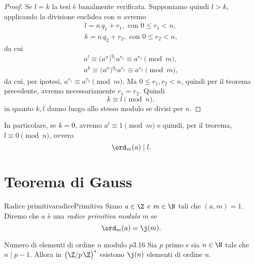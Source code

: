 \begin{proof}
	Se \(l=k\) la tesi è banalmente verificata.
	Supponiamo quindi \(l>k\), applicando la divisione euclidea con \(n\) avremo
	\begin{gather*}
		l = n\,q_1 + r_1,\text{ con }0 \le r_1 < n,\\
		k = n\,q_2 + r_2,\text{ con }0 \le r_2 < n,
	\end{gather*}
	da cui
	\begin{gather*}
		a^l \equiv \big( a^n \big)^{q_1}a^{r_1} \equiv a^{r_1} \pmod{m},\\
		a^k \equiv \big( a^n \big)^{q_2}a^{r_2} \equiv a^{r_2} \pmod{m},
	\end{gather*}
	da cui, per ipotesi, \(a^{r_1} \equiv a^{r_2} \pmod{m}\).
	Ma \(0\le r_1,r_2 <n\), quindi per il teorema precedente, avremo necessariamente \(r_1 = r_2\).
	Quindi
	\[
		k \equiv l \pmod{n},
	\]
	in quanto \(k,l\) danno luogo allo stesso modulo se divisi per \(n\).
\end{proof}

\begin{oss}
	In particolare, se \(k=0\), avremo \(a^l \equiv 1 \pmod{m}\) e quindi, per il teorema, \(l \equiv 0 \pmod{n}\), ovvero
	\[
		\ord_m(a) \mid l.
	\]
\end{oss}
%
%
\section{Teorema di Gauss}

\begin{defn}{Radice primitiva}{radicePrimitiva}
	Siano \(a\in\Z\) e \(m\in\N\) tali che \((a,m) = 1\).
	Diremo che \(a\) è una \emph{radice primitiva modulo \(m\)} se
	\[
		\ord_m(a) = \j(m).
	\]
\end{defn}

\begin{prop}{Numero di elementi di ordine \(n\) modulo \(p\)}{3.16}
	Sia \(p\) primo e sia \(n\in\N\) tale che \(n\mid p-1\).
	Allora in \(\big(\Z/p\,\Z\big)^*\) esistono \(\j(n)\) elementi di ordine \(n\).
\end{prop}

